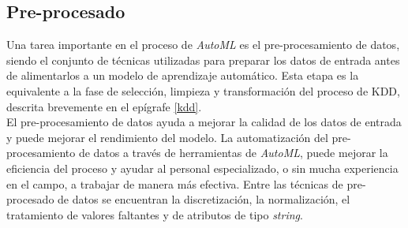 \subsection{Pre-procesado} \label{epig:preprocesado}
Una tarea importante en el proceso de \textit{AutoML} es el pre-procesamiento de datos, siendo el conjunto de técnicas utilizadas para preparar los datos de entrada antes de alimentarlos a un modelo de aprendizaje automático. Esta etapa es la equivalente a la fase de selección, limpieza y transformación del proceso de KDD, descrita brevemente en el epígrafe \ref{kdd}. \\
El pre-procesamiento de datos ayuda a mejorar la calidad de los datos de entrada y puede mejorar el rendimiento del modelo. La automatización del pre-procesamiento de datos a través de herramientas de \textit{AutoML}, puede mejorar la eficiencia del proceso y ayudar al personal especializado, o sin mucha experiencia en el campo, a trabajar de manera más efectiva. Entre las técnicas de pre-procesado de datos se encuentran la discretización, la normalización, el tratamiento de valores faltantes y de atributos de tipo \textit{string}.

